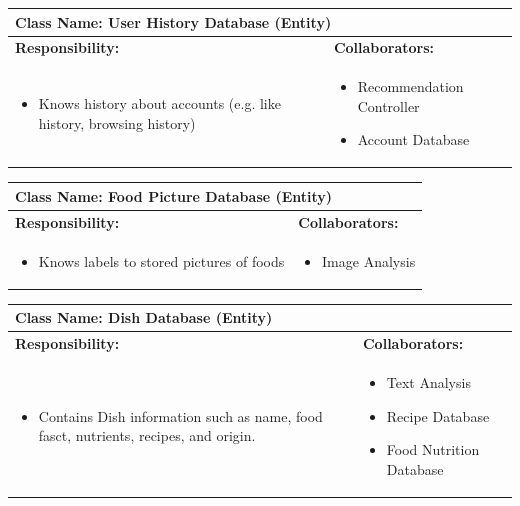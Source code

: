 \documentclass[]{article}
\begin{document}
\begin{table}[H]
	\centering
	\begin{tabular}{|p{7cm}|p{7cm}|}
	\hline 
	 \multicolumn{2}{|l|}{\textbf{Class Name:} User History Database (Entity) }\\
	\hline
	\textbf{Responsibility:} & \textbf{Collaborators:} \\
	\hline
	\raggedright
	\begin{itemize}
		\item Knows history about accounts (e.g. like history, browsing history)
	\end{itemize}
	\vspace{1in} & 
	\begin{itemize}
		\item Recommendation Controller
		\item Account Database
	\end{itemize} \\
	\hline
	\end{tabular}
\end{table}

\begin{table}[H]
	\centering
	\begin{tabular}{|p{7cm}|p{7cm}|}
	\hline 
	 \multicolumn{2}{|l|}{\textbf{Class Name:} Food Picture Database (Entity) }\\
	\hline
	\textbf{Responsibility:} & \textbf{Collaborators:} \\
	\hline
	\raggedright
	\begin{itemize}
		\item Knows labels to stored pictures of foods 
	\end{itemize}
	\vspace{1in} & 
	\begin{itemize}
		\item Image Analysis
	\end{itemize} \\
	\hline
	\end{tabular}
\end{table}

\begin{table}[H]
	\centering
	\begin{tabular}{|p{7cm}|p{7cm}|}
	\hline 
	 \multicolumn{2}{|l|}{\textbf{Class Name:} Dish Database (Entity) }\\
	\hline
	\textbf{Responsibility:} & \textbf{Collaborators:} \\
	\hline
	\raggedright
	\begin{itemize}
		\item Contains Dish information such as name, food fasct, nutrients, recipes, and origin.
	\end{itemize}
	\vspace{1in} & 
	\begin{itemize}
		\item Text Analysis
		\item Recipe Database
		\item Food Nutrition Database
	\end{itemize} \\
	\hline
	\end{tabular}
\end{table}
\end{document}

